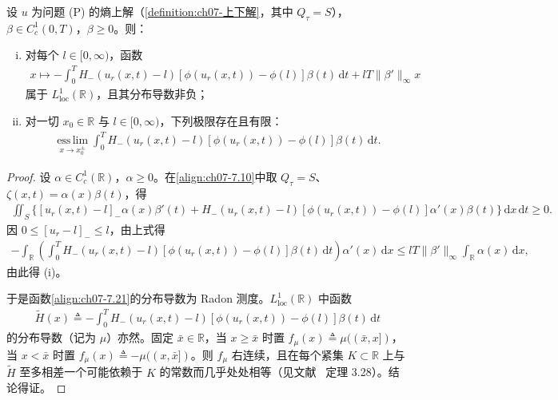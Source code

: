 \documentclass[../../main.tex]{subfiles}%
\begin{document}
\begin{lemma}\label{lemma:ch07-7.2.3}
设 $u$ 为问题 (P) 的熵上解（\cref{definition:ch07-上下解}，其中 $Q_\tau=S$），$\beta\in C^1_c(0,T)$，$\beta\geqslant0$。则：
\begin{enumerate}[(i)]
\item 对每个 $l\in[0,\infty)$，函数
\begin{align}
x\mapsto-\int_0^T H_-(u_r(x,t)-l)[\phi(u_r(x,t))-\phi(l)]\beta(t)\,\mathrm{d}t+lT\|\beta'\|_\infty x \label{align:ch07-7.21}
\end{align}
属于 $L^1_{\mathrm{loc}}(\mathbb{R})$，且其分布导数非负；
\item 对一切 $x_0\in\mathbb{R}$ 与 $l\in[0,\infty)$，下列极限存在且有限：
\begin{align}
\operatorname*{ess\,lim}_{x\to x_0^\pm}\int_0^T H_-(u_r(x,t)-l)[\phi(u_r(x,t))-\phi(l)]\beta(t)\,\mathrm{d}t. \label{align:ch07-7.22}
\end{align}
\end{enumerate}
\end{lemma}

\begin{proof}
设 $\alpha\in C^1_c(\mathbb{R})$，$\alpha\geqslant0$。在\eqref{align:ch07-7.10}中取 $Q_\tau=S$、$\zeta(x,t)=\alpha(x)\beta(t)$，得
\begin{align*}
\iint_S\{[u_r(x,t)-l]_-\alpha(x)\beta'(t)+H_-(u_r(x,t)-l)[\phi(u_r(x,t))-\phi(l)]\alpha'(x)\beta(t)\}\,\mathrm{d}x\,\mathrm{d}t\geqslant0.
\end{align*}
因 $0\leqslant[u_r-l]_-\leqslant l$，由上式得
\begin{align*}
-\int_{\mathbb{R}}\left(\int_0^T H_-(u_r(x,t)-l)[\phi(u_r(x,t))-\phi(l)]\beta(t)\,\mathrm{d}t\right)\alpha'(x)\,\mathrm{d}x
\leqslant lT\|\beta'\|_\infty\int_{\mathbb{R}}\alpha(x)\,\mathrm{d}x,
\end{align*}
由此得 (i)。

于是函数\eqref{align:ch07-7.21}的分布导数为 Radon 测度。$L^1_{\mathrm{loc}}(\mathbb{R})$ 中函数
\begin{align*}
\widetilde H(x)\triangleq-\int_0^T H_-(u_r(x,t)-l)[\phi(u_r(x,t))-\phi(l)]\beta(t)\,\mathrm{d}t
\end{align*}
的分布导数（记为 $\mu$）亦然。固定 $\bar x\in\mathbb{R}$，当 $x\geqslant\bar x$ 时置 $f_\mu(x)\triangleq\mu((\bar x,x])$，当 $x<\bar x$ 时置 $f_\mu(x)\triangleq-\mu((x,\bar x])$。则 $f_\mu$ 右连续，且在每个紧集 $K\subset\mathbb{R}$ 上与 $\widetilde H$ 至多相差一个可能依赖于 $K$ 的常数而几乎处处相等（见文献~\cite{ref05} 定理 3.28）。结论得证。
\end{proof}
\end{document}
